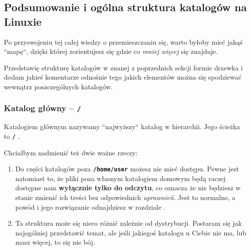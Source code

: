 \documentclass[11pt, a4paper]{article}
\newcommand{\ttbf}[1]{
    \texttt{\textbf{#1}}
}
\begin{document}
\subsection{Podsumowanie i ogólna struktura katalogów na Linuxie}

Po przyswojeniu tej całej wiedzy o przemieszczaniu się, warto byłoby mieć jakąś ``mapę``, dzięki której zorientujesz się gdzie co \emph{mniej więcej} się znajduje.

Przedstawię strukturę katalogów w znanej z poprzednich sekcji formie drzewka i dodam jakieś komentarze odnośnie tego jakich elementów można się spodziewać wewnątrz poszczególnych katalogów.

\subsubsection{Katalog główny -- \ttbf{/}}

Katalogiem głównym nazywamy ``najwyższy`` katalog w hierarchii. Jego ścieżka to \ttbf{/}.

Chciałbym nadmienić też dwie ważne rzeczy:

\begin{enumerate}
    \item Do części katalogów poza \ttbf{/home/user} możesz nie mieć dostępu. Pewne jest natomiast to, że pliki poza własnym katalogiem domowym będą raczej dostępne nam \textbf{wyłącznie tylko do odczytu}, co oznacza że nie będziesz w stanie zmienić ich treści bez odpowiednich \emph{uprawnień}. Jest to normalne, a powód i jego rozwiązanie odnajdziesz w rozdziale .
    \item Ta struktura może się nieco różnić zależnie od dystrybucji. Postaram się jak najogólniej przedstawić temat, ale jeśli jakiegoś katalogu u Ciebie nie ma, lub masz więcej, to się nie bój.
\end{enumerate}
\end{document}

